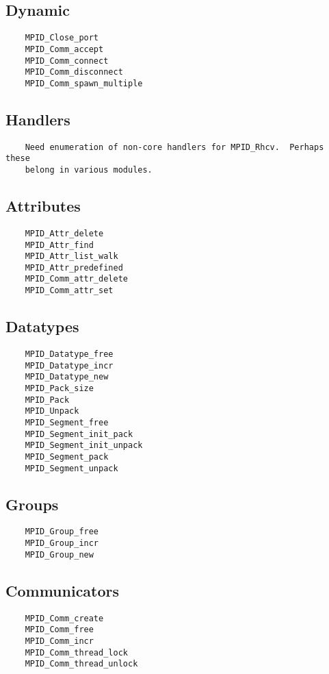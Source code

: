 \documentclass{article}
\begin{document}
\subsection{Dynamic}
\begin{verbatim}
    MPID_Close_port
    MPID_Comm_accept
    MPID_Comm_connect
    MPID_Comm_disconnect
    MPID_Comm_spawn_multiple
\end{verbatim}

\subsection{Handlers}
\begin{verbatim}
    Need enumeration of non-core handlers for MPID_Rhcv.  Perhaps these 
    belong in various modules.
\end{verbatim}

\subsection{Attributes}
\begin{verbatim}
    MPID_Attr_delete
    MPID_Attr_find
    MPID_Attr_list_walk
    MPID_Attr_predefined
    MPID_Comm_attr_delete
    MPID_Comm_attr_set
\end{verbatim}


\subsection{Datatypes}
\begin{verbatim}
    MPID_Datatype_free
    MPID_Datatype_incr
    MPID_Datatype_new
    MPID_Pack_size
    MPID_Pack
    MPID_Unpack
    MPID_Segment_free
    MPID_Segment_init_pack
    MPID_Segment_init_unpack
    MPID_Segment_pack
    MPID_Segment_unpack
\end{verbatim}

\subsection{Groups}
\begin{verbatim}
    MPID_Group_free
    MPID_Group_incr
    MPID_Group_new
\end{verbatim}

\subsection{Communicators}
\begin{verbatim}
    MPID_Comm_create
    MPID_Comm_free
    MPID_Comm_incr
    MPID_Comm_thread_lock
    MPID_Comm_thread_unlock
\end{verbatim}
\end{document}
